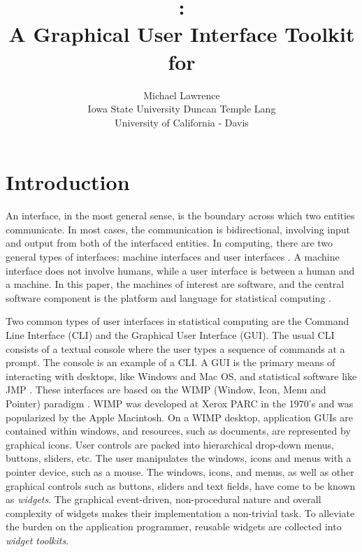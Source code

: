 \documentclass[article]{jss}
\author{Michael Lawrence\\
Iowa State University \And Duncan Temple Lang\\
University of California - Davis}
\title{\pkg{RGtk2}:\\A Graphical User Interface Toolkit for
\proglang{R}}
\begin{document}
\section{Introduction}


An interface, in the most general sense, is the boundary across which
two
entities communicate. In most cases, the communication is
bidirectional, 
involving input and output from both of the interfaced entities. In
computing,
there are two general types of interfaces: machine interfaces and user
interfaces
\citep{gui-cli}. A machine interface does not involve humans, while a 
user interface is between a human and a machine. In this paper, the
machines of
interest are software, and the central software component is the
platform and language for statistical computing \citep{R}.

Two common types of user interfaces in statistical computing are the
Command Line Interface (CLI) and the Graphical User Interface
(GUI). The usual CLI consists of a textual console where the user
types a sequence of commands at a prompt. The  console is
an example of a CLI. A GUI is the primary means of interacting with
desktops, like Windows and Mac OS, and statistical software like JMP
\citep{JMP}. These interfaces are based on the WIMP (Window, Icon,
Menu and Pointer) paradigm \citep{WIMP}. WIMP was developed at Xerox
PARC in the 1970's and was popularized by the Apple Macintosh. On a
WIMP desktop, application GUIs are contained within windows, and
resources, such as documents, are represented by graphical icons.
User controls are packed into hierarchical drop-down menus, buttons,
sliders, etc. The user manipulates the windows, icons and menus with a
pointer device, such as a mouse.  The windows, icons, and menus, as
well as other graphical controls such as buttons, sliders and text
fields, have come to be known as \emph{widgets}. The graphical
event-driven, non-procedural nature and overall complexity of widgets
makes their implementation a non-trivial task.  To alleviate the
burden on the application programmer, reusable widgets are collected
into \emph{widget toolkits}.
\end{document}
